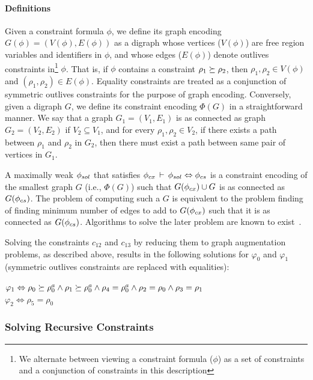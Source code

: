 \paragraph{Definitions} Given a constraint formula $\phi$, we define
its graph encoding $G(\phi)=(V(\phi),E(\phi))$ as a digraph whose
vertices ($V(\phi)$) are free region variables and identifiers in
$\phi$, and whose edges ($E(\phi)$) denote outlives constraints
in\footnote{We alternate between viewing a constraint formula ($\phi$)
as a set of constraints and a conjunction of constraints in this
description} $\phi$.  That is, if $\phi$ contains a constraint $\rho_1
\succeq \rho_2$, then $\rho_1,\rho_2 \in V(\phi)$ and
$(\rho_1,\rho_2) \in E(\phi)$. Equality constraints are treated as a
conjunction of symmetric outlives constraints for the purpose of graph
encoding. Conversely, given a digraph $G$, we define its constraint
encoding $\Phi(G)$ in a straightforward manner. We say that a graph
$G_1=(V_1,E_1)$ is as connected as graph $G_2=(V_2,E_2)$ if $V_2
\subseteq V_1$, and for every $\rho_1, \rho_2 \in V_2$, if there
exists a path between $\rho_1$ and $\rho_2$ in $G_2$, then there must
exist a path between same pair of vertices in $G_1$. 

A maximally weak $\phi_{sol}$ that satisfies $\phi_{cx}\,\vdash\,\phi_{sol}
\Leftrightarrow \phi_{cs}$ is a constraint encoding of the smallest
graph $G$ (i.e., $\Phi(G)$) such that $G(\phi_{cx}) \cup G$ is as
connected as $G(\phi_{cs})$. The problem of computing such a $G$ is
equivalent to the problem finding of finding minimum number of edges
to add to $G(\phi_{cx})$ such that it is as connected as $G(\phi_{cs})$.
Algorithms to solve the later problem are known to
exist~\cite{siam92}.

Solving the constraints $c_{12}$ and $c_{13}$ by reducing them to
graph augmentation problems, as described above, results in the
following solutions for $\varphi_0$ and $\varphi_1$ (symmetric
outlives constraints are replaced with equalities):
\begin{center}
\(
  \varphi_1 \Leftrightarrow \rho_0 \succeq \rho^a_0 \wedge \rho_1
     \succeq \rho^a_0 \wedge \rho_4 = \rho^a_0 \wedge 
     \rho_2 = \rho_0 \wedge \rho_3 = \rho_1
\)\\
\(
  \varphi_2 \Leftrightarrow \rho_5 = \rho_0
\)
\end{center}

\subsubsection{Solving Recursive Constraints}


